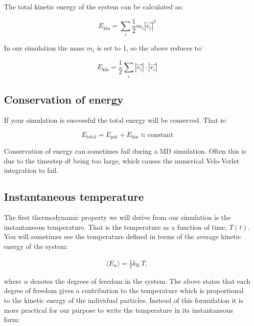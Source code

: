 \documentclass{article}
\begin{document}
The total kinetic energy of the system can be calculated as:

\begin{equation}
    E_{\mathrm{kin}} = \sum_i \frac{1}{2} m_i |\vec{v_i}|^2
\end{equation}

In our simulation the mass $m_i$ is set to 1, so the above reduces to:

\begin{equation}
    E_{\mathrm{kin}} = \frac{1}{2} \sum_i |\vec{v_i}| \cdot |\vec{v_i}|
\end{equation}

% 
% 


\subsection{Conservation of energy}

If your simulation is successful the total energy will be conserved. That is:

\begin{equation}
    E_{\mathrm{total}} = E_{\mathrm{pot}} + E_{\mathrm{kin}} \approx \mathrm{constant}
\end{equation}

Conservation of energy can sometimes fail during a MD simulation.
Often this is due to the timestep $dt$ being too large, which causes the numerical Velo-Verlet integration to fail.


\subsection{Instantaneous temperature}

The first thermodynamic property we will derive from our simulation is the instantaneous temperature.
That is the temperature as a function of time, $T(t)$.
You will sometimes see the temperature defined in terms of the average kinetic energy of the system:

\begin{eqnarray}
    \langle E_{\alpha} \rangle = \frac{1}{2} k_\mathrm{B} \ T,
\end{eqnarray}

where $\alpha$ denotes the degrees of freedom in the system.
The above states that each degree of freedom gives a contribution to the temperature which is proportional to the kinetic energy of the individual particles.
Instead of this formulation it is more practical for our purpose to write the temperature in its instantaneous form:
\end{document}
